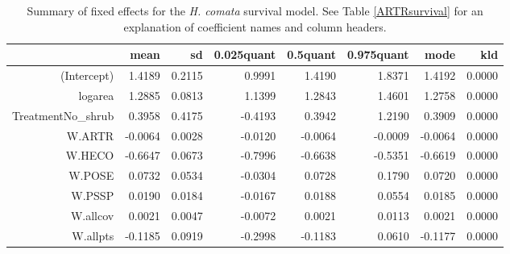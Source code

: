 \documentclass[11pt]{article}
\begin{document}
\begin{table}[ht]
\centering
\caption{Summary of fixed effects for the \textit{H. comata} survival model. See Table \ref{ARTRsurvival} for an explanation of coefficient names
and column headers.} 
\label{HECOsurvival}
\begin{tabular}{rrrrrrrr}
  \hline
 & mean & sd & 0.025quant & 0.5quant & 0.975quant & mode & kld \\ 
  \hline
(Intercept) & 1.4189 & 0.2115 & 0.9991 & 1.4190 & 1.8371 & 1.4192 & 0.0000 \\ 
  logarea & 1.2885 & 0.0813 & 1.1399 & 1.2843 & 1.4601 & 1.2758 & 0.0000 \\ 
  TreatmentNo\_shrub & 0.3958 & 0.4175 & -0.4193 & 0.3942 & 1.2190 & 0.3909 & 0.0000 \\ 
  W.ARTR & -0.0064 & 0.0028 & -0.0120 & -0.0064 & -0.0009 & -0.0064 & 0.0000 \\ 
  W.HECO & -0.6647 & 0.0673 & -0.7996 & -0.6638 & -0.5351 & -0.6619 & 0.0000 \\ 
  W.POSE & 0.0732 & 0.0534 & -0.0304 & 0.0728 & 0.1790 & 0.0720 & 0.0000 \\ 
  W.PSSP & 0.0190 & 0.0184 & -0.0167 & 0.0188 & 0.0554 & 0.0185 & 0.0000 \\ 
  W.allcov & 0.0021 & 0.0047 & -0.0072 & 0.0021 & 0.0113 & 0.0021 & 0.0000 \\ 
  W.allpts & -0.1185 & 0.0919 & -0.2998 & -0.1183 & 0.0610 & -0.1177 & 0.0000 \\ 
   \hline
\end{tabular}
\end{table}
\end{document}
